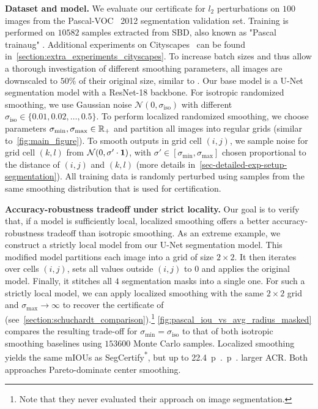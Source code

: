 \documentclass{article} %
\theoremstyle{plain}
\theoremstyle{definition}
\theoremstyle{remark}
\begin{document}
\textbf{Dataset and model.}
We evaluate our certificate for $l_2$ perturbations on $100$ images from the Pascal-VOC~\citep{Everingham2010} 2012 segmentation validation set.
Training is performed on $10582$ samples extracted from SBD, also known as "Pascal trainaug" \citep{Hariharan2011}.
Additional experiments on Cityscapes~\citep{Cordts2016} can be found in~\autoref{section:extra_experiments_cityscapes}.
To increase batch sizes and thus allow a thorough investigation of different smoothing parameters, all images are  downscaled to $50\%$ of their original size, similar to \citep{Fischer2021}.
Our base model is a U-Net segmentation model \citep{Ronneberger2015} with a ResNet-18 backbone.
For isotropic randomized smoothing, we use Gaussian noise
$\mathcal{N}\left(0, \sigma_\mathrm{iso}\right)$ with different $\sigma_\mathrm{iso} \in \{0.01,0.02,\dots,0.5\}$.
To perform localized randomized smoothing, we choose parameters $\sigma_\mathrm{min}, \sigma_\mathrm{max} \in {\mathbb{R}}_+$ and partition all images into regular grids (similar to~\autoref{fig:main_figure}).
To smooth outputs in grid cell $(i,j)$, we sample noise for grid cell $(k,l)$ from $\mathcal{N}(0,\sigma' \cdot \bm{1})$, with $\sigma' \in  [\sigma_\mathrm{min}, \sigma_\mathrm{max}]$ chosen proportional to the distance of $(i,j)$ and $(k,l)$ (more details in~\autoref{sec-detailed-exp-setup-segmentation}).
All training data is randomly perturbed using samples from the same smoothing distribution that is used for certification.

\textbf{Accuracy-robustness tradeoff under strict locality.}
Our goal is to verify that, if a model is sufficiently local, localized smoothing offers a better accuracy-robustness tradeoff than isotropic smoothing.
As an extreme example, we construct a strictly local model from our U-Net segmentation model.
This modified model partitions each image into a grid of size $2 \times 2$. It then iterates over cells $(i, j)$, sets all values outside $(i,j)$ to $0$ and applies  the original model. Finally, it stitches all $4$ segmentation masks into a single one.
For such a strictly local model, we can apply localized smoothing with the same $2 \times 2$ grid and $\sigma_\mathrm{max} \rightarrow \infty$ to recover the certificate of~\citet{Schuchardt2021} (see~\autoref{section:schuchardt_comparison}).\footnote{Note that they never evaluated their approach on image segmentation.}
\autoref{fig:pascal_iou_vs_avg_radius_masked}  compares the resulting trade-off for $\sigma_\mathrm{min} = \sigma_\mathrm{iso}$ to that of both isotropic smoothing baselines using $153600$ Monte Carlo samples.
Localized smoothing yields the same mIOUs as SegCertify\textsuperscript{*}, but up to \SI{22.4}{p{.}p{.}} larger ACR. Both approaches Pareto-dominate center smoothing.
\end{document}
